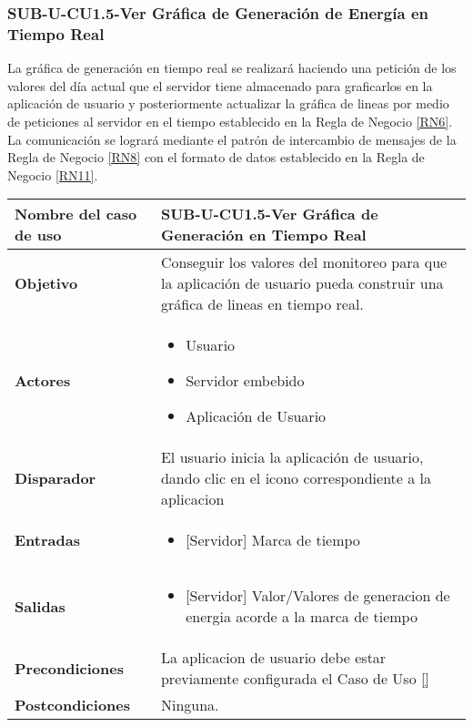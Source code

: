 \subsubsection{SUB-U-CU1.5-Ver Gráfica de Generación de Energía en Tiempo Real}\label{SUB-U-CU1.5}
La gráfica de generación en tiempo real se realizará haciendo una petición de los valores del día actual que el servidor tiene almacenado para graficarlos en la aplicación de usuario y posteriormente actualizar la gráfica de lineas por medio de peticiones al servidor en el tiempo establecido en la Regla de Negocio \ref{RN6}.
\\ La comunicación se logrará mediante el patrón de intercambio de mensajes de la Regla de Negocio \ref{RN8} con el formato de datos establecido en la Regla de Negocio \ref{RN11}. 

\begin{longtable}{|J{5cm}|J{10.3cm}|}
	\hline
	\textbf{Nombre del caso de uso} &
		SUB-U-CU1.5-Ver Gráfica de Generación en Tiempo Real \\ \hline
	\textbf{Objetivo} &
		Conseguir los valores del monitoreo para que la aplicación de usuario pueda construir una gráfica de lineas en tiempo real. \\ \hline
	\textbf{Actores} &
		\begin{itemize}
		    \item Usuario
			\item Servidor embebido
			\item Aplicación de Usuario
		\end{itemize} \\ \hline
	\textbf{Disparador} & 
	    El usuario inicia la aplicación de usuario, dando clic en el icono correspondiente a la aplicacion\\ \hline 
	\textbf{Entradas} & 
		\begin{itemize}
				\item{[Servidor]} Marca de tiempo
		\end{itemize}\\ \hline 
	\textbf{Salidas} & 
		\begin{itemize}
			\item{[Servidor]} Valor/Valores de generacion de energia acorde a la marca de tiempo
		\end{itemize} \\ \hline
	\textbf{Precondiciones} &
		La aplicacion de usuario debe estar previamente configurada el Caso de Uso \ref{} \\ \hline
	\textbf{Postcondiciones} &
		Ninguna.\\ \hline

\end{longtable}
